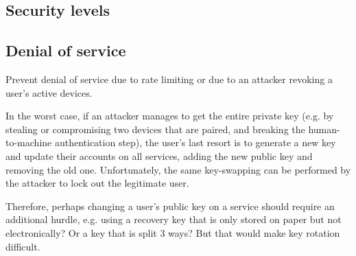 \subsection{Security levels}



\subsection{Denial of service}

Prevent denial of service due to rate limiting or due to an attacker revoking a user's active
devices.

In the worst case, if an attacker manages to get the entire private key (e.g. by stealing or
compromising two devices that are paired, and breaking the human-to-machine authentication step),
the user's last resort is to generate a new key and update their accounts on all services, adding
the new public key and removing the old one. Unfortunately, the same key-swapping can be performed
by the attacker to lock out the legitimate user.

Therefore, perhaps changing a user's public key on a service should require an additional hurdle,
e.g. using a recovery key that is only stored on paper but not electronically? Or a key that is
split 3 ways? But that would make key rotation difficult.

